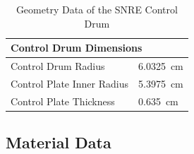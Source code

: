 \documentclass[8pt,a5paper]{article}
\begin{document}
\begin{table}[h!]
    \label{table: Table 5}
    \centering
    \small
    \caption{Geometry Data of the SNRE Control Drum}
    \begin{tabular}{|l|l|}
    \hline
    \multicolumn{2}{|l|}{\textbf{Control Drum Dimensions}}\\\hline
    Control Drum Radius & \SI{6.0325}{cm}\\
    Control Plate Inner Radius & \SI{5.3975}{cm}\\
    Control Plate Thickness & \SI{0.635}{cm}\\\hline
    \end{tabular}
\end{table}

\subsection*{Material Data}
\end{document}
